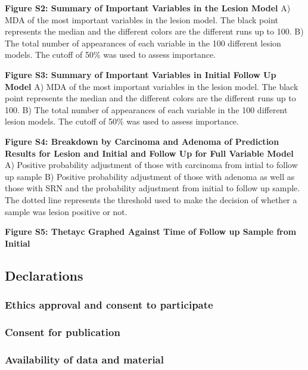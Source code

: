 \documentclass[12pt,]{article}
\begin{document}
\textbf{Figure S2: Summary of Important Variables in the Lesion Model}
A) MDA of the most important variables in the lesion model. The black
point represents the median and the different colors are the different
runs up to 100. B) The total number of appearances of each variable in
the 100 different lesion models. The cutoff of 50\% was used to assess
importance.

\textbf{Figure S3: Summary of Important Variables in Initial Follow Up
Model} A) MDA of the most important variables in the lesion model. The
black point represents the median and the different colors are the
different runs up to 100. B) The total number of appearances of each
variable in the 100 different lesion models. The cutoff of 50\% was used
to assess importance.

\textbf{Figure S4: Breakdown by Carcinoma and Adenoma of Prediction
Results for Lesion and Initial and Follow Up for Full Variable Model} A)
Positive probability adjustment of those with carcinoma from intial to
follow up sample B) Positive probability adjustment of those with
adenoma as well as those with SRN and the probability adjustment from
initial to follow up sample. The dotted line represents the threshold
used to make the decision of whether a sample was lesion positive or
not.

\textbf{Figure S5: Thetayc Graphed Against Time of Follow up Sample from
Initial}

\newpage

\subsection{Declarations}\label{declarations}

\subsubsection{Ethics approval and consent to
participate}\label{ethics-approval-and-consent-to-participate}

\subsubsection{Consent for publication}\label{consent-for-publication}

\subsubsection{Availability of data and
material}\label{availability-of-data-and-material}
\end{document}
